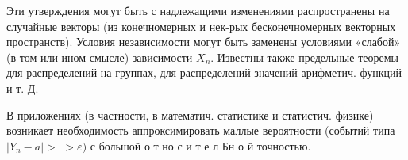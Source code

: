 \documentclass[10pt]{article}
\begin{document}
Эти утверждения могут быть с надлежащими изменениями распространены на случайные векторы (из конечномерных и нек-рых бесконечномерных векторных пространств). Условия независимости могут быть заменены условиями «слабой» (в том или ином смысле) зависимости $X_{n}$. Известны также предельные теоремы для распределений на группах, для распределений значений арифметич. функций и т. Д.



В приложениях (в частности, в математич. статистике и статистич. физике) возникает необходимость аппроксимировать маллые вероятности (событий типа $\left|Y_{n}-a\right|>$ $>\varepsilon)$ с большой о т но с и т е л Бн о й точностью.
\end{document}

